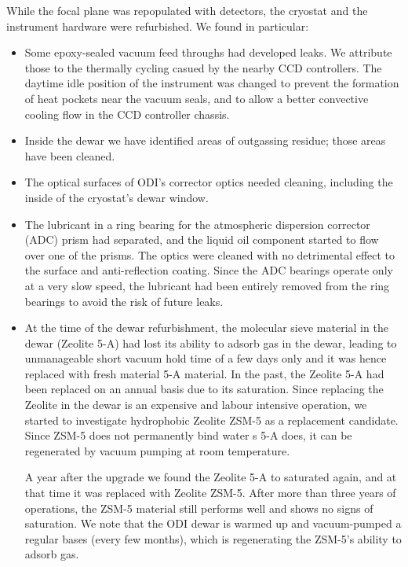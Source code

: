 \documentclass[]{spieman}
\begin{document}
While the focal plane was repopulated with detectors, the cryostat and the 
instrument hardware were refurbished. We found in particular:
\begin{itemize}
	\item Some epoxy-sealed vacuum feed throughs had developed  leaks. We 
	attribute those to the thermally cycling casued by the nearby CCD controllers. 
	The daytime idle position of the instrument was changed to prevent the 
	formation of heat pockets near the vacuum seals, and to allow a better
	convective cooling flow in the CCD controller chassis.
	
	\item Inside the dewar we have identified areas of outgassing residue; 
	those areas have been cleaned. 
	
	\item The optical surfaces of ODI's corrector optics needed cleaning,
	 including the inside of the cryostat's dewar window. 
	
	\item The lubricant in a ring bearing for the atmospheric dispersion 
	corrector (ADC) prism had separated, and the liquid oil component started to 
	flow over one of the prisms. The optics were cleaned with no detrimental effect 
	to the surface and anti-reflection coating. Since the ADC bearings operate 
	only at a very slow speed, the lubricant had been entirely removed from the 
	ring bearings to avoid the risk of future leaks. 
	

\item  At the time of the dewar refurbishment, the molecular 
sieve material in the dewar (Zeolite 5-A) had lost its ability to adsorb gas in 
the dewar, leading to unmanageable short vacuum hold time of a few days only 
and it was hence  replaced with fresh material 5-A material. In the past, the 
Zeolite 5-A had been replaced on an annual basis due to its saturation. Since 
replacing the Zeolite in the dewar is an expensive and labour intensive operation, 
we started to investigate hydrophobic Zeolite ZSM-5 as a replacement candidate. Since 
ZSM-5 does not permanently bind water s 5-A does, it can be regenerated by vacuum 
pumping at room temperature. 

A year after the upgrade we found the Zeolite 5-A to  saturated again, and at that
time it was replaced with Zeolite ZSM-5. After more than three years of operations, 
the ZSM-5 material still performs well and shows no signs of saturation. We note 
that the ODI dewar is warmed up and vacuum-pumped a regular bases (every few months), 
which is regenerating the ZSM-5's ability to adsorb gas.
\end{itemize}
\end{document}
